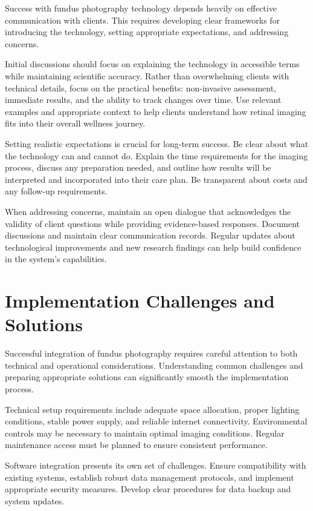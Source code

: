\documentclass[
  Letterpaper,
]{scrbook}
\begin{document}
Success with fundus photography technology depends heavily on effective
communication with clients. This requires developing clear frameworks
for introducing the technology, setting appropriate expectations, and
addressing concerns.

Initial discussions should focus on explaining the technology in
accessible terms while maintaining scientific accuracy. Rather than
overwhelming clients with technical details, focus on the practical
benefits: non-invasive assessment, immediate results, and the ability to
track changes over time. Use relevant examples and appropriate context
to help clients understand how retinal imaging fits into their overall
wellness journey.

Setting realistic expectations is crucial for long-term success. Be
clear about what the technology can and cannot do. Explain the time
requirements for the imaging process, discuss any preparation needed,
and outline how results will be interpreted and incorporated into their
care plan. Be transparent about costs and any follow-up requirements.

When addressing concerns, maintain an open dialogue that acknowledges
the validity of client questions while providing evidence-based
responses. Document discussions and maintain clear communication
records. Regular updates about technological improvements and new
research findings can help build confidence in the system's
capabilities.

\section{Implementation Challenges and
Solutions}\label{implementation-challenges-and-solutions}

Successful integration of fundus photography requires careful attention
to both technical and operational considerations. Understanding common
challenges and preparing appropriate solutions can significantly smooth
the implementation process.

Technical setup requirements include adequate space allocation, proper
lighting conditions, stable power supply, and reliable internet
connectivity. Environmental controls may be necessary to maintain
optimal imaging conditions. Regular maintenance access must be planned
to ensure consistent performance.

Software integration presents its own set of challenges. Ensure
compatibility with existing systems, establish robust data management
protocols, and implement appropriate security measures. Develop clear
procedures for data backup and system updates.
\end{document}
